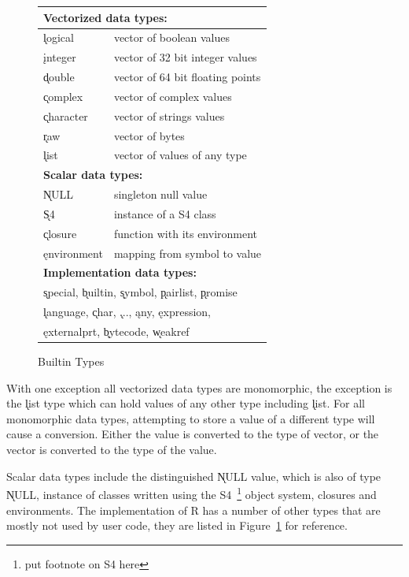 \documentclass[acmsmall,review,anonymous]{acmart}\settopmatter{printfolios=true,printccs=false,printacmref=false}
\begin{document}
\begin{figure}
\footnotesize\begin{tabular}{l|l@{}}\hline
\multicolumn{2}{l}{\bf Vectorized data types:}  \\\hline
\k{logical}   & vector of boolean values\\
\k{integer}   & vector of 32 bit integer values\\
\k{double}    & vector of 64 bit floating points\\
\k{complex}   & vector of complex values\\
\k{character} & vector of strings values\\
\k{raw}       & vector of bytes\\
\k{list}      & vector of values of any type\\\hline
\multicolumn{2}{l}{\bf Scalar data types:}\\\hline
\k{NULL}      &  singleton null value\\
\k{S4}        &  instance of a S4 class \\
\k{closure}   &  function with its environment\\
\k{environment}& mapping from symbol to value \\\hline
\multicolumn{2}{l}{\bf Implementation data types:}\\\hline
\multicolumn{2}{l}{\k{special},
\k{builtin},
\k{symbol},
\k{pairlist},
\k{promise}}\\
\multicolumn{2}{l}{
\k{language},
\k{char},
\k{...},
\k{any},
\k{expression},
}\\
\multicolumn{2}{l}{
\k{externalprt},
\k{bytecode},
\k{weakref}}\\\hline
\end{tabular}\caption{Builtin Types}\label{types}\end{figure}

With one exception all vectorized data types are monomorphic, the exception
is the \k{list} type which can hold values of any other type including
\k{list}. For all monomorphic data types, attempting to store a value of a
different type will cause a conversion. Either the value is converted to the
type of vector, or the vector is converted to the type of the value.

Scalar data types include the distinguished \k{NULL} value, which is also of
type \k{NULL}, instance of classes written using the S4~\footnote{put footnote on S4 here} object system,
closures and environments.  The implementation of R has a number of other
types that are mostly not used by user code, they are listed in
Figure~\ref{types} for reference.
\end{document}
